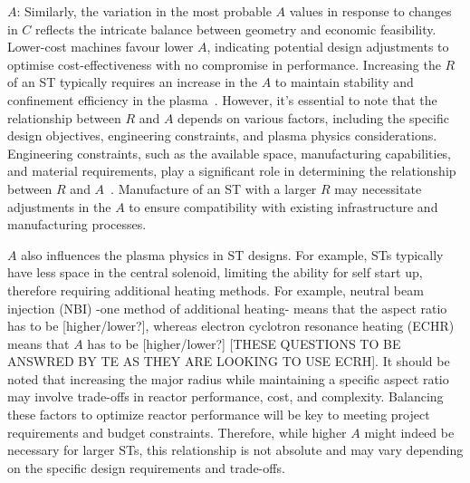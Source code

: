\documentclass[journal]{IEEEtran}
\begin{document}
\textbf{$A$}: Similarly, the variation in the most probable $A$ values in response to changes in $C$ reflects the intricate balance between geometry and economic feasibility. Lower-cost machines favour lower $A$, indicating potential design adjustments to optimise cost-effectiveness with no compromise in performance. Increasing the $R$ of an ST typically requires an increase in the $A$ to maintain stability and confinement efficiency in the plasma~\cite{Costley2021}. However, it's essential to note that the relationship between $R$ and $A$ depends on various factors, including the specific design objectives, engineering constraints, and plasma physics considerations. Engineering constraints, such as the available space, manufacturing capabilities, and material requirements, play a significant role in determining the relationship between $R$ and $A$~\cite{Costley2021}. Manufacture of an ST with a larger $R$ may necessitate adjustments in the $A$ to ensure compatibility with existing infrastructure and manufacturing processes. 

$A$ also influences the plasma physics in ST designs. For example, STs typically have less space in the central solenoid, limiting the ability for self start up, therefore requiring additional heating methods. For example, neutral beam injection (NBI) -one method of additional heating- means that the aspect ratio has to be [higher/lower?], whereas electron cyclotron resonance heating (ECHR) means that $A$ has to be [higher/lower?] [THESE QUESTIONS TO BE ANSWRED BY TE AS THEY ARE LOOKING TO USE ECRH]. It should be noted that increasing the major radius while maintaining a specific aspect ratio may involve trade-offs in reactor performance, cost, and complexity. Balancing these factors to optimize reactor performance will be key to meeting project requirements and budget constraints. Therefore, while higher $A$ might indeed be necessary for larger STs, this relationship is not absolute and may vary depending on the specific design requirements and trade-offs.
\end{document}
